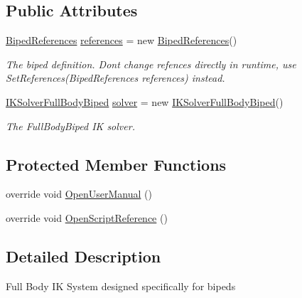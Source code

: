 \subsection*{Public Attributes}
\begin{DoxyCompactItemize}
\item 
\mbox{\hyperlink{class_root_motion_1_1_biped_references}{Biped\+References}} \mbox{\hyperlink{class_root_motion_1_1_final_i_k_1_1_full_body_biped_i_k_a0dfac5c2550dad76128806dd5fdc019b}{references}} = new \mbox{\hyperlink{class_root_motion_1_1_biped_references}{Biped\+References}}()
\begin{DoxyCompactList}\small\item\em The biped definition. Don\textquotesingle{}t change refences directly in runtime, use Set\+References(\+Biped\+References references) instead. \end{DoxyCompactList}\item 
\mbox{\hyperlink{class_root_motion_1_1_final_i_k_1_1_i_k_solver_full_body_biped}{I\+K\+Solver\+Full\+Body\+Biped}} \mbox{\hyperlink{class_root_motion_1_1_final_i_k_1_1_full_body_biped_i_k_ae1ba56ebef8d8312da5a610a90472823}{solver}} = new \mbox{\hyperlink{class_root_motion_1_1_final_i_k_1_1_i_k_solver_full_body_biped}{I\+K\+Solver\+Full\+Body\+Biped}}()
\begin{DoxyCompactList}\small\item\em The Full\+Body\+Biped IK solver. \end{DoxyCompactList}\end{DoxyCompactItemize}
\subsection*{Protected Member Functions}
\begin{DoxyCompactItemize}
\item 
override void \mbox{\hyperlink{class_root_motion_1_1_final_i_k_1_1_full_body_biped_i_k_a18f11840a747ff0163ba5933b026badc}{Open\+User\+Manual}} ()
\item 
override void \mbox{\hyperlink{class_root_motion_1_1_final_i_k_1_1_full_body_biped_i_k_aae4e2635775efc0a5f2b1058b7e693fe}{Open\+Script\+Reference}} ()
\end{DoxyCompactItemize}


\subsection{Detailed Description}
Full Body IK System designed specifically for bipeds 



